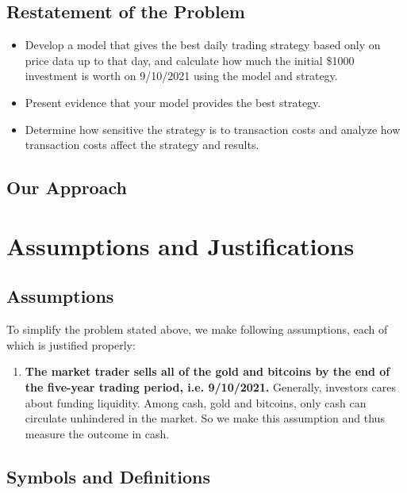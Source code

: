 \documentclass[12pt,a4paper]{article}
\begin{document}
\begin{spacing}{1.2}
\subsection{Restatement of the Problem}

\begin{itemize}
	\item Develop a model that gives the best daily trading strategy based only on price data up 
	to that day, and calculate how much the initial \$1000 investment is worth on 9/10/2021 using the 
	model and strategy.
	
	\item Present evidence that your model provides the best strategy.
	
	\item Determine how sensitive the strategy is to transaction costs and analyze how transaction costs
	affect the strategy and results.
	
\end{itemize}

\subsection{Our Approach}


\section{Assumptions and Justifications}
\label{Assumptions_Justifications}

\subsection{Assumptions}
To simplify the problem stated above, we make following assumptions, each of which is justified properly: 
\begin{enumerate}
	\item \textbf{The market trader sells all of the gold and bitcoins by the end of the five-year trading period, i.e. 9/10/2021.} Generally, investors cares about funding liquidity. Among cash, gold and bitcoins, only cash can circulate unhindered in the market. So we make this assumption and thus measure the outcome in cash.
\end{enumerate}


\subsection{Symbols and Definitions}


\end{spacing}
\end{document}
